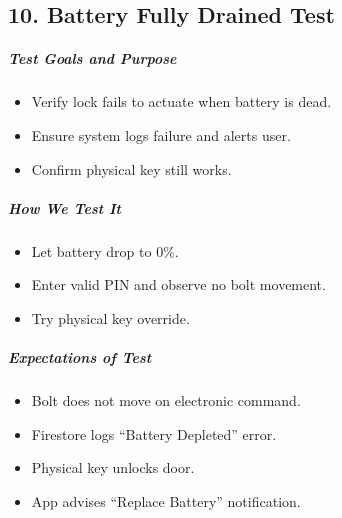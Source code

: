 \subsection*{10. Battery Fully Drained Test}
\subparagraph{Test Goals and Purpose}
\begin{itemize}
    \item Verify lock fails to actuate when battery is dead.
    \item Ensure system logs failure and alerts user.
    \item Confirm physical key still works.
\end{itemize}
\subparagraph{How We Test It}
\begin{itemize}
    \item Let battery drop to 0\%.
    \item Enter valid PIN and observe no bolt movement.
    \item Try physical key override.
\end{itemize}
\subparagraph{Expectations of Test}
\begin{itemize}
    \item Bolt does not move on electronic command.
    \item Firestore logs “Battery Depleted” error.
    \item Physical key unlocks door.
    \item App advises “Replace Battery” notification.
\end{itemize}


